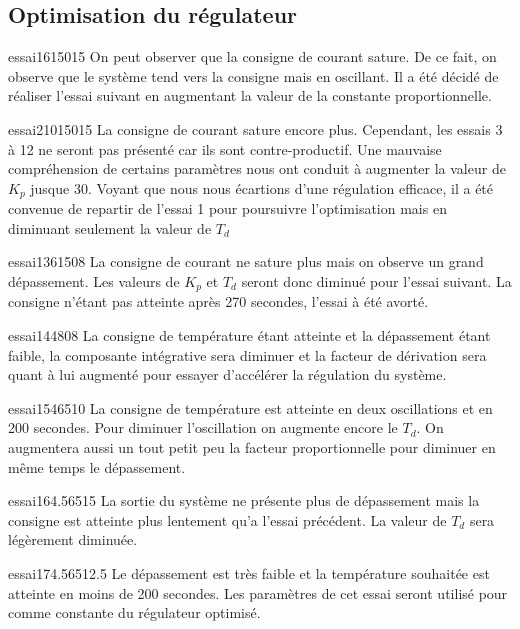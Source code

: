 \subsection{Optimisation du régulateur}
\begin{optibox}{essai1}{6}{150}{15}
On peut observer que la consigne de courant sature. De ce fait, on observe que le système tend vers la consigne mais en oscillant.  Il a été décidé de réaliser l'essai suivant en augmentant la valeur de la constante proportionnelle.
 \\\hline
\end{optibox}
\begin{optibox}{essai2}{10}{150}{15}
La consigne de courant sature encore plus.
Cependant, les essais 3 à 12 ne seront pas présenté car ils sont contre-productif. Une mauvaise compréhension de certains paramètres nous ont conduit à augmenter la valeur de $K_{p}$ jusque 30. Voyant que nous nous écartions d'une régulation efficace, il a été convenue de repartir de l'essai 1 pour poursuivre l'optimisation mais en diminuant seulement la valeur de $T_{d}$\\
\hline
\end{optibox}
\begin{optibox}{essai13}{6}{150}{8}
La consigne de courant ne sature plus mais on observe un grand dépassement. Les valeurs de $K_{p}$ et $T_{d}$ seront donc diminué pour l'essai suivant. La consigne n'étant pas atteinte après 270 secondes, l'essai à été avorté. 
\\\hline
\end{optibox}
\begin{optibox}{essai14}{4}{80}{8}
La consigne de température étant atteinte et la dépassement étant faible, la composante intégrative sera diminuer et la facteur de dérivation sera quant à lui augmenté pour essayer d'accélérer la régulation du système.
 \\\hline
\end{optibox}
\begin{optibox}{essai15}{4}{65}{10}
La consigne de température est atteinte en deux oscillations et en 200 secondes. Pour diminuer l'oscillation on augmente encore le  $T_{d}$. On augmentera aussi un tout petit peu la facteur proportionnelle pour diminuer en même temps le dépassement.\\\hline
\end{optibox}
\begin{optibox}{essai16}{4.5}{65}{15}
La sortie du système ne présente plus de dépassement mais la consigne est atteinte plus lentement qu'a l'essai précédent. La valeur de $T_{d}$ sera légèrement diminuée.
\\\hline
\end{optibox}
\begin{optibox}{essai17}{4.5}{65}{12.5}
Le dépassement est très faible et la température souhaitée est atteinte en moins de 200 secondes. 
Les paramètres de cet essai seront utilisé pour comme constante du régulateur optimisé.
\\\hline
\end{optibox}


